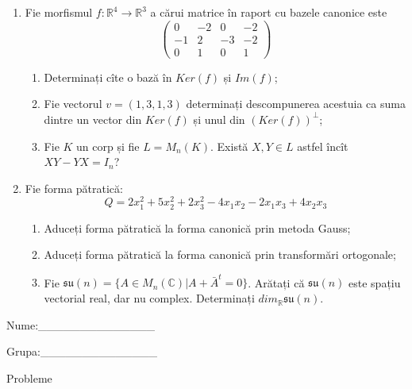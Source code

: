 \documentclass{article}
\begin{document}
\begin{enumerate}
 \item Fie morfismul $f:\mathbb{R}^4 \to \mathbb{R}^3$ a cărui matrice în raport cu bazele canonice este
$$\begin{pmatrix}
0&-2&0&-2\\
-1&2&-3&-2\\
0&1&0&1
\end{pmatrix}$$

\begin{enumerate}
\item Determinați cîte o bază în $Ker(f)$ și $Im(f)$;
\item Fie vectorul $v=(1,3,1,3)$ determinați descompunerea acestuia ca suma dintre un vector din $Ker(f)$ și unul din $(Ker(f))^\perp$;
\item Fie $K$ un corp și fie $L=M_n(K)$. Există $X,Y \in L$ astfel încît $XY-YX=I_n$?  
\end{enumerate}
\item Fie forma pătratică:
$$Q= 2x_1^2+5x_2^2+2x_3^2-4x_1x_2-2x_1x_3+4x_2x_3$$

\begin{enumerate}
\item Aduceți forma pătratică la forma canonică prin metoda Gauss;
\item Aduceți forma pătratică la forma canonică prin transformări ortogonale;
\item Fie $\mathfrak{su}(n)=\{ A \in M_n(\mathbb{C}) | A+\bar{A}^t=0\}$. Arătați că $\mathfrak{su}(n)$ este spațiu vectorial real, dar nu complex.
Determinați $dim_{\mathbb{R}}\mathfrak{su}(n)$.
\end{enumerate}
\end{enumerate}
\newpage
\begin{flushright}
Nume:\_\_\_\_\_\_\_\_\_\_\_\_\_\_
 
 
Grupa:\_\_\_\_\_\_\_\_\_\_\_\_\_\_
\end{flushright}
\begin{center}
\vspace{2cm}
{\Large Probleme}
\vspace{2cm}
\end{center}
\end{document}
